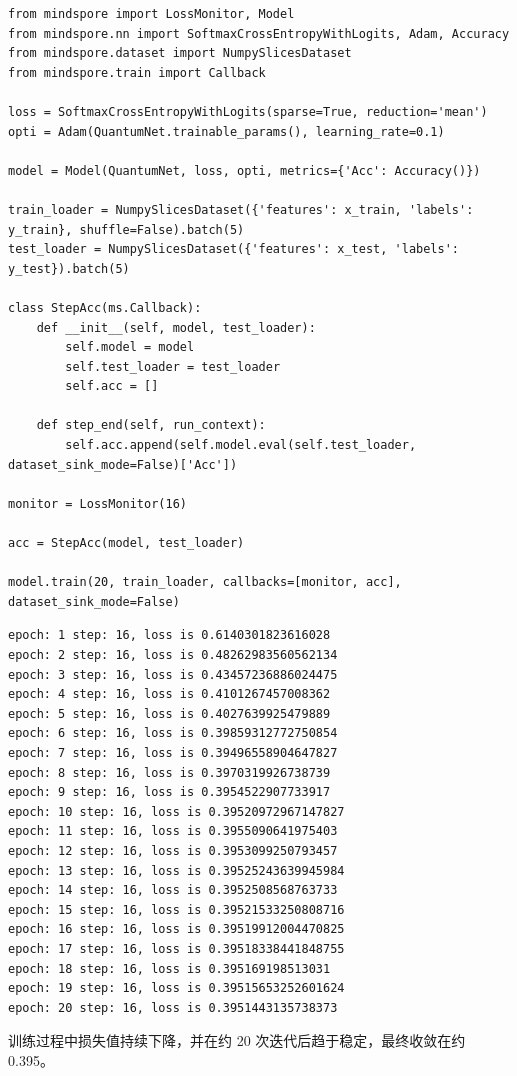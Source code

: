 \begin{lstlisting}
from mindspore import LossMonitor, Model
from mindspore.nn import SoftmaxCrossEntropyWithLogits, Adam, Accuracy
from mindspore.dataset import NumpySlicesDataset
from mindspore.train import Callback

loss = SoftmaxCrossEntropyWithLogits(sparse=True, reduction='mean')
opti = Adam(QuantumNet.trainable_params(), learning_rate=0.1)

model = Model(QuantumNet, loss, opti, metrics={'Acc': Accuracy()})

train_loader = NumpySlicesDataset({'features': x_train, 'labels': y_train}, shuffle=False).batch(5)
test_loader = NumpySlicesDataset({'features': x_test, 'labels': y_test}).batch(5)

class StepAcc(ms.Callback):
    def __init__(self, model, test_loader):
        self.model = model
        self.test_loader = test_loader
        self.acc = []

    def step_end(self, run_context):
        self.acc.append(self.model.eval(self.test_loader, dataset_sink_mode=False)['Acc'])

monitor = LossMonitor(16)

acc = StepAcc(model, test_loader)

model.train(20, train_loader, callbacks=[monitor, acc], dataset_sink_mode=False)
\end{lstlisting}

\begin{lstlisting}
epoch: 1 step: 16, loss is 0.6140301823616028
epoch: 2 step: 16, loss is 0.48262983560562134
epoch: 3 step: 16, loss is 0.43457236886024475
epoch: 4 step: 16, loss is 0.4101267457008362
epoch: 5 step: 16, loss is 0.4027639925479889
epoch: 6 step: 16, loss is 0.39859312772750854
epoch: 7 step: 16, loss is 0.39496558904647827
epoch: 8 step: 16, loss is 0.3970319926738739
epoch: 9 step: 16, loss is 0.3954522907733917
epoch: 10 step: 16, loss is 0.39520972967147827
epoch: 11 step: 16, loss is 0.3955090641975403
epoch: 12 step: 16, loss is 0.3953099250793457
epoch: 13 step: 16, loss is 0.39525243639945984
epoch: 14 step: 16, loss is 0.3952508568763733
epoch: 15 step: 16, loss is 0.39521533250808716
epoch: 16 step: 16, loss is 0.39519912004470825
epoch: 17 step: 16, loss is 0.39518338441848755
epoch: 18 step: 16, loss is 0.395169198513031
epoch: 19 step: 16, loss is 0.39515653252601624
epoch: 20 step: 16, loss is 0.3951443135738373
\end{lstlisting}

训练过程中损失值持续下降，并在约 20 次迭代后趋于稳定，最终收敛在约 0.395。

